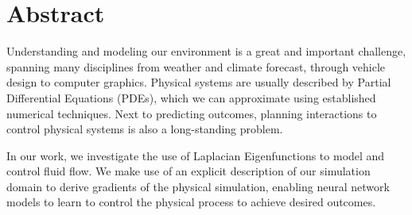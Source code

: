 \chapter*{Abstract}

Understanding and modeling our environment is a great and important challenge,
spanning many disciplines from weather and climate forecast, through vehicle
design to computer graphics. Physical systems are usually described by Partial
Differential Equations (PDEs), which we can approximate using established
numerical techniques. Next to predicting outcomes, planning interactions to
control physical systems is also a long-standing problem.

In our work, we investigate the use of Laplacian Eigenfunctions to model and
control fluid flow. We make use of an explicit description of our simulation
domain to derive gradients of the physical simulation, enabling neural network
models to learn to control the physical process to achieve desired outcomes.

\vfill
\cleardoublepage

\selectthesislanguage

\setcounter{romanPage}{\value{page}}
